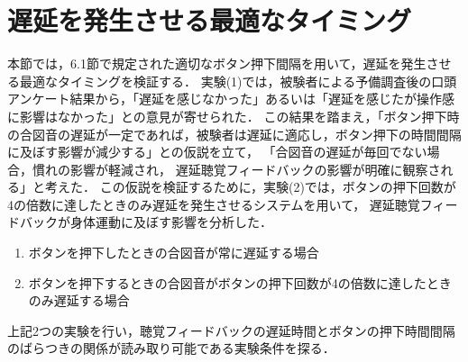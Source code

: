 \section{遅延を発生させる最適なタイミング}
本節では，6.1節で規定された適切なボタン押下間隔を用いて，遅延を発生させる最適なタイミングを検証する．
実験(1)では，被験者による予備調査後の口頭アンケート結果から，「遅延を感じなかった」あるいは「遅延を感じたが操作感に影響はなかった」との意見が寄せられた．
この結果を踏まえ，「ボタン押下時の合図音の遅延が一定であれば，被験者は遅延に適応し，ボタン押下の時間間隔に及ぼす影響が減少する」との仮説を立て，
「合図音の遅延が毎回でない場合，慣れの影響が軽減され，
遅延聴覚フィードバックの影響が明確に観察される」と考えた．
この仮説を検証するために，実験(2)では，ボタンの押下回数が4の倍数に達したときのみ遅延を発生させるシステムを用いて，
遅延聴覚フィードバックが身体運動に及ぼす影響を分析した．
\begin{enumerate}[leftmargin=*, label=実験(\arabic*)]
    \item ボタンを押下したときの合図音が常に遅延する場合
    \item ボタンを押下するときの合図音がボタンの押下回数が4の倍数に達したときのみ遅延する場合
\end{enumerate}
上記2つの実験を行い，聴覚フィードバックの遅延時間とボタンの押下時間間隔のばらつきの関係が読み取り可能である実験条件を探る．
